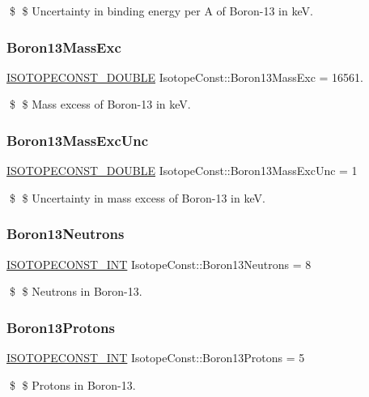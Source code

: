 \$ \$ Uncertainty in binding energy per A of Boron-\/13 in keV. \mbox{\label{group___isotope_const-_boron-_b13_ga73261d95ebc1c108a05a1ec40f1dafdc}} 
\subsubsection{\texorpdfstring{Boron13\+Mass\+Exc}{Boron13MassExc}}
{\footnotesize\ttfamily \mbox{\hyperlink{group___isotope_const-_macros_ga8f45a7272ce02c0b4c65c44636ed719a}{I\+S\+O\+T\+O\+P\+E\+C\+O\+N\+S\+T\+\_\+\+D\+O\+U\+B\+LE}} Isotope\+Const\+::\+Boron13\+Mass\+Exc = 16561.}

\$ \$ Mass excess of Boron-\/13 in keV. \mbox{\label{group___isotope_const-_boron-_b13_ga5bbd8bf54c40aac2faa279ceb876c160}} 
\subsubsection{\texorpdfstring{Boron13\+Mass\+Exc\+Unc}{Boron13MassExcUnc}}
{\footnotesize\ttfamily \mbox{\hyperlink{group___isotope_const-_macros_ga8f45a7272ce02c0b4c65c44636ed719a}{I\+S\+O\+T\+O\+P\+E\+C\+O\+N\+S\+T\+\_\+\+D\+O\+U\+B\+LE}} Isotope\+Const\+::\+Boron13\+Mass\+Exc\+Unc = 1}

\$ \$ Uncertainty in mass excess of Boron-\/13 in keV. \mbox{\label{group___isotope_const-_boron-_b13_ga3755d87f661cf6c16f80929bd74b324b}} 
\subsubsection{\texorpdfstring{Boron13\+Neutrons}{Boron13Neutrons}}
{\footnotesize\ttfamily \mbox{\hyperlink{group___isotope_const-_macros_ga5f18360b3e99483a35c32d789e62621c}{I\+S\+O\+T\+O\+P\+E\+C\+O\+N\+S\+T\+\_\+\+I\+NT}} Isotope\+Const\+::\+Boron13\+Neutrons = 8}

\$ \$ Neutrons in Boron-\/13. \mbox{\label{group___isotope_const-_boron-_b13_ga075e7bc204c94831542be16998548556}} 
\subsubsection{\texorpdfstring{Boron13\+Protons}{Boron13Protons}}
{\footnotesize\ttfamily \mbox{\hyperlink{group___isotope_const-_macros_ga5f18360b3e99483a35c32d789e62621c}{I\+S\+O\+T\+O\+P\+E\+C\+O\+N\+S\+T\+\_\+\+I\+NT}} Isotope\+Const\+::\+Boron13\+Protons = 5}

\$ \$ Protons in Boron-\/13. 
